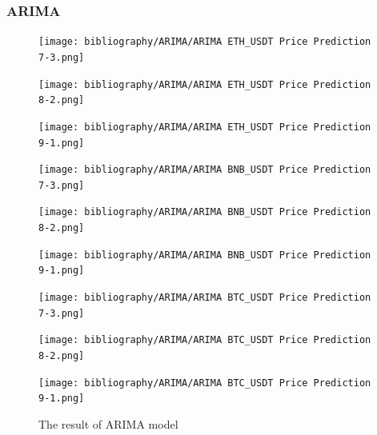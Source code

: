 \documentclass{ieeeojies}
\begin{document}
\subsubsection{ARIMA}
\begin{figure}[H]
    \centering
    \begin{minipage}{0.15\textwidth}
    \centering
    \texttt{[image: bibliography/ARIMA/ARIMA ETH\_USDT Price Prediction 7-3.png]}
    \end{minipage}
    \hfill
    \begin{minipage}{0.15\textwidth}
    \centering
    \texttt{[image: bibliography/ARIMA/ARIMA ETH\_USDT Price Prediction 8-2.png]}
    \end{minipage}
    \hfill
    \begin{minipage}{0.15\textwidth}
    \centering
    \texttt{[image: bibliography/ARIMA/ARIMA ETH\_USDT Price Prediction 9-1.png]}
    \end{minipage}
    \centering
    \begin{minipage}{0.15\textwidth}
    \centering
    \texttt{[image: bibliography/ARIMA/ARIMA BNB\_USDT Price Prediction 7-3.png]}
    \end{minipage}
    \hfill
    \begin{minipage}{0.15\textwidth}
    \centering
    \texttt{[image: bibliography/ARIMA/ARIMA BNB\_USDT Price Prediction 8-2.png]}
    \end{minipage}
    \hfill
    \begin{minipage}{0.15\textwidth}
    \centering
    \texttt{[image: bibliography/ARIMA/ARIMA BNB\_USDT Price Prediction 9-1.png]}
    \end{minipage}
    \centering
    \begin{minipage}{0.15\textwidth}
    \centering
    \texttt{[image: bibliography/ARIMA/ARIMA BTC\_USDT Price Prediction 7-3.png]}
    \end{minipage}
    \hfill
    \begin{minipage}{0.15\textwidth}
    \centering
    \texttt{[image: bibliography/ARIMA/ARIMA BTC\_USDT Price Prediction 8-2.png]}
    \end{minipage}
    \hfill
    \begin{minipage}{0.15\textwidth}
    \centering
    \texttt{[image: bibliography/ARIMA/ARIMA BTC\_USDT Price Prediction 9-1.png]}
    \end{minipage}
    \caption{The result of ARIMA model}
    \label{fig:enter-label}
\end{figure}
\end{document}
